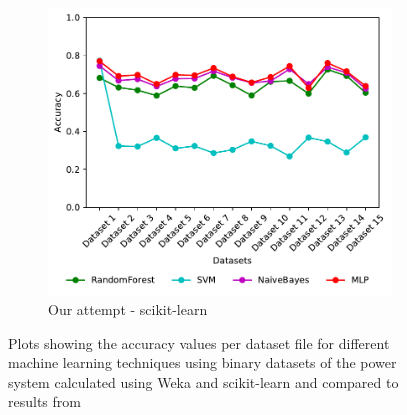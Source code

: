 \begin{figure}[H]
\begin{subfigure}[t]{110mm}
        \includegraphics[width=\linewidth, page = 1]{images/accuracy}
        \caption{Our attempt - scikit-learn}
    \end{subfigure}
    \caption{Plots showing the accuracy values per dataset file for different machine learning techniques using binary datasets of the power system calculated using Weka and scikit-learn and compared to results from \cite{borges_hink_machine_2014-1}}
    \label{fig:weka_acc2}
\end{figure}

